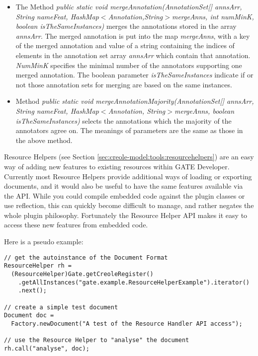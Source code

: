 \begin{itemize}

\item The Method {\em public static void mergeAnnotation(AnnotationSet[]
    annsArr, String nameFeat, HashMap$<$Annotation,String$>$mergeAnns, int
    numMinK, boolean isTheSameInstances)} merges the annotations stored in the
  array {\em annsArr}. The merged annotation is put into the map {\em
    mergeAnns}, with a key of the merged annotation and value of a string
  containing the indices of elements in the annotation set array {\em annsArr}
  which contain that annotation.  {\em NumMinK} specifies the minimal number
  of the annotators supporting one merged annotation. The boolean parameter
  {\em isTheSameInstances} indicate if or not those annotation sets for
  merging are based on the same instances.

\item Method {\em public static void mergeAnnotationMajority(AnnotationSet[]
    annsArr, String nameFeat, HashMap$<$Annotation, String$>$mergeAnns,
    boolean isTheSameInstances)} selects the annotations which the majority of
  the annotators agree on. The meanings of parameters are the same as those in
  the above method.


\end{itemize}

Resource Helpers (see Section \ref{sec:creole-model:tools:resourcehelpers})
are an easy way of adding new features to existing resources within GATE
Developer. Currently most Resource Helpers provide additional ways of loading
or exporting documents, and it would also be useful to have the same features
available via the API. While you could compile embedded code against the plugin
classes or use reflection, this can quickly become difficult to manage, and
rather negates the whole plugin philosophy. Fortunately the Resource Helper
API makes it easy to access these new features from embedded code.

Here is a pseudo example:

\begin{lstlisting}
// get the autoinstance of the Document Format
ResourceHelper rh =
  (ResourceHelper)Gate.getCreoleRegister()
    .getAllInstances("gate.example.ResourceHelperExample").iterator()
    .next();

// create a simple test document
Document doc =
  Factory.newDocument("A test of the Resource Handler API access");

// use the Resource Helper to "analyse" the document
rh.call("analyse", doc);
\end{lstlisting}

